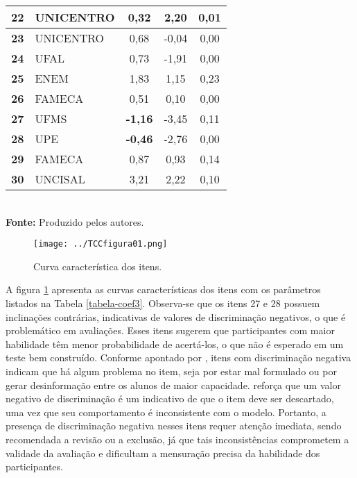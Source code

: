 \begin{table}[!htb]
\begin{tabular*}{.9\textwidth}{@{\extracolsep{\fill}}clccc@{}}
		\hline \textbf{22} & UNICENTRO & 0,32 & 2,20 & 0,01 \\ 
		\hline \textbf{23} & UNICENTRO & 0,68 & -0,04 & 0,00  \\ 
		\hline \textbf{24} & UFAL & 0,73 & -1,91 & 0,00 \\ 
		\hline \textbf{25} & ENEM & 1,83 & 1,15 & 0,23  \\ 
		\hline \textbf{26} & FAMECA & 0,51 & 0,10 & 0,00 \\ 
		\hline \textbf{27} & UFMS & \textbf{-1,16} & -3,45 & 0,11  \\ 
		\hline \textbf{28} & UPE & \textbf{-0,46} & -2,76 & 0,00  \\ 
		\hline \textbf{29} & FAMECA & 0,87 & 0,93 & 0,14  \\ 
		\hline \textbf{30} & UNCISAL & 3,21 & 2,22 & 0,10 \\ 
			\bottomrule
		\end{tabular*}\\
		\vspace*{0.5cm}
		\small{\textbf{Fonte:} Produzido pelos autores.}
\end{table}
\clearpage
\begin{figure}[H]
	\centering
	\caption{Curva característica dos itens.}
	\texttt{[image: ../TCCfigura01.png]}
	\parbox{\textwidth}{
		\centering %
	}
	\label{fig:curva_itens}
\end{figure}

A figura \ref{fig:curva_itens} apresenta as curvas características dos itens com os parâmetros listados na Tabela \ref{tabela-coef3}. Observa-se que os itens 27 e 28 possuem inclinações contrárias, indicativas de valores de discriminação negativos, o que é problemático em avaliações. Esses itens sugerem que participantes com maior habilidade têm menor probabilidade de acertá-los, o que não é esperado em um teste bem construído. Conforme apontado por , itens com discriminação negativa indicam que há algum problema no item, seja por estar mal formulado ou por gerar desinformação entre os alunos de maior capacidade.  reforça que um valor negativo de discriminação é um indicativo de que o item deve ser descartado, uma vez que seu comportamento é inconsistente com o modelo. Portanto, a presença de discriminação negativa nesses itens requer atenção imediata, sendo recomendada a revisão ou a exclusão, já que tais inconsistências comprometem a validade da avaliação e dificultam a mensuração precisa da habilidade dos participantes.

